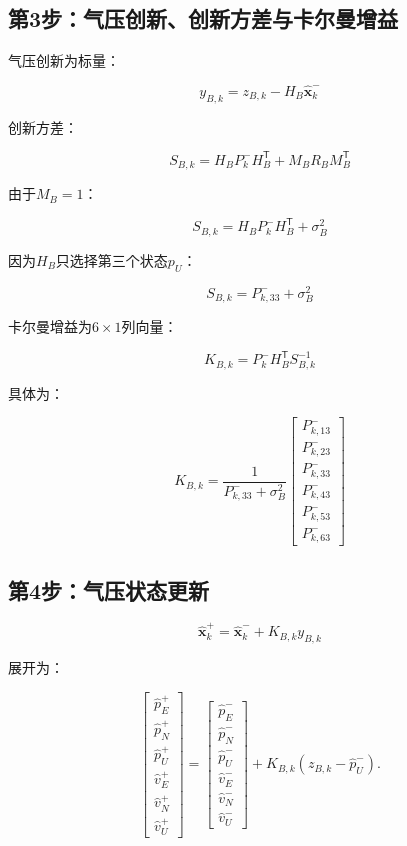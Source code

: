\documentclass[12pt,a4paper]{ctexart}
\newcommand{\xhat}{\hat{\mathbf x}}
\newcommand{\transpose}{^{\mathsf T}}
\begin{document}
\subsection*{第3步：气压创新、创新方差与卡尔曼增益}

气压创新为标量：

\[
\boxed{
y_{B,k}
=
z_{B,k}
-
H_B\xhat_k^-
}
\]

创新方差：

\[
\boxed{
S_{B,k}
=
H_BP_k^-H_B\transpose
+
M_BR_BM_B\transpose
}
\]

由于$M_B=1$：

\[
\boxed{
S_{B,k}
=
H_BP_k^-H_B\transpose+\sigma_B^2
}
\]

因为$H_B$只选择第三个状态$p_U$：

\[
\boxed{
S_{B,k}
=
P_{k,33}^-+\sigma_B^2
}
\]

卡尔曼增益为$6\times1$列向量：

\[
\boxed{
K_{B,k}
=
P_k^-H_B\transpose S_{B,k}^{-1}
}
\]

具体为：

\[
\boxed{
K_{B,k}
=
\frac{1}{P_{k,33}^-+\sigma_B^2}
\begin{bmatrix}
P_{k,13}^-\\
P_{k,23}^-\\
P_{k,33}^-\\
P_{k,43}^-\\
P_{k,53}^-\\
P_{k,63}^-
\end{bmatrix}
}
\]

\subsection*{第4步：气压状态更新}

\[
\boxed{
\xhat_k^+
=
\xhat_k^-
+
K_{B,k}y_{B,k}
}
\]

展开为：

\[
\begin{bmatrix}
\hat p_E^+\\
\hat p_N^+\\
\hat p_U^+\\
\hat v_E^+\\
\hat v_N^+\\
\hat v_U^+
\end{bmatrix}
=
\begin{bmatrix}
\hat p_E^-\\
\hat p_N^-\\
\hat p_U^-\\
\hat v_E^-\\
\hat v_N^-\\
\hat v_U^-
\end{bmatrix}
+
K_{B,k}
\left(
z_{B,k}-\hat p_U^-
\right).
\]
\end{document}
